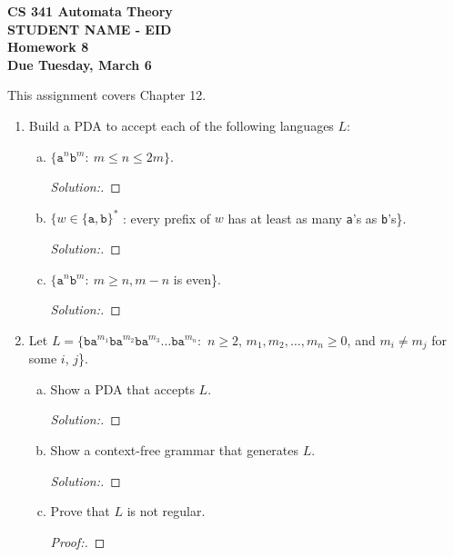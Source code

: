 \documentclass[10pt]{article}
\begin{document}
\begin{flushleft}
\textbf{\noindent
CS 341 Automata Theory \\
STUDENT NAME - EID \\
Homework 8 \\
Due Tuesday, March 6}\\
\end{flushleft}
\noindent
This assignment covers Chapter 12. \\

\begin{enumerate}[1)]


\item
Build a PDA to accept each of the following languages $L$:
\begin{enumerate}[a)]
\item
$\{\texttt{a}^n\texttt{b}^m:\ m \leq n \leq 2m\}$.
\begin{proof}[Solution:]
\end{proof}

\item
$\{w \in \{\texttt{a}, \texttt{b}\}^*$ : every prefix of $w$ has at least as many \texttt{a}'s as \texttt{b}'s\}.
\begin{proof}[Solution:]
\end{proof}

\item
$\{\texttt{a}^n\texttt{b}^m:\ m \geq n, m-n$ is even\}.
\begin{proof}[Solution:]
\end{proof}
\end{enumerate}


\item
Let $L = \{\texttt{ba}^{m_1}\texttt{ba}^{m_2}\texttt{ba}^{m_3} \ldots \texttt{ba}^{m_n}:$ $n \geq 2$, $m_1, m_2, \ldots, m_n \geq 0$, and $m_i \neq m_j$ for some $i$, $j$\}.
\begin{enumerate}[a)]
\item
Show a PDA that accepts $L$.
\begin{proof}[Solution:]
\end{proof}

\item
Show a context-free grammar that generates $L$.
\begin{proof}[Solution:]
\end{proof}

\item
Prove that $L$ is not regular.
\begin{proof}[Proof:]
\end{proof}
\end{enumerate}


\end{enumerate}
\end{document}
